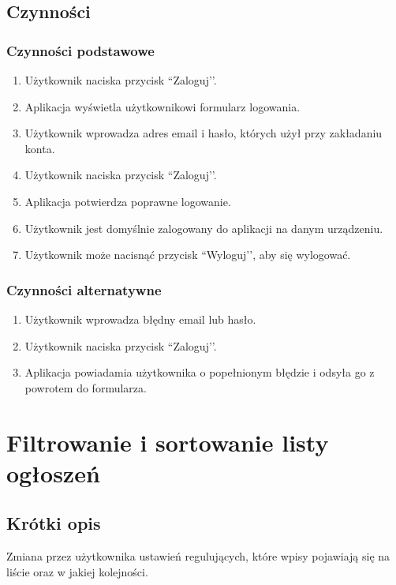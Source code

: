 \documentclass[12pt,a4paper,twoside]{article}
\begin{document}
    \subsection{Czynności}


    \subsubsection{Czynności podstawowe}


    \begin{enumerate}
        \item Użytkownik naciska przycisk ``Zaloguj’’.
        \item Aplikacja wyświetla użytkownikowi formularz logowania.
        \item Użytkownik wprowadza adres email i hasło, których użył przy zakładaniu konta.
        \item Użytkownik naciska przycisk ``Zaloguj’’.
        \item Aplikacja potwierdza poprawne logowanie.
     \item Użytkownik jest domyślnie zalogowany do aplikacji na danym urządzeniu.
     \item Użytkownik może nacisnąć przycisk ``Wyloguj’’, aby się wylogować.
    \end{enumerate}


    \subsubsection{Czynności alternatywne}


    \begin{enumerate}
        \item Użytkownik wprowadza błędny email lub hasło.
        \item Użytkownik naciska przycisk ``Zaloguj’’.
        \item Aplikacja powiadamia użytkownika o popełnionym błędzie i odsyła go z powrotem do formularza.
    \end{enumerate}


    \section{Filtrowanie i sortowanie listy ogłoszeń}


    \subsection{Krótki opis}
    Zmiana przez użytkownika ustawień regulujących, które wpisy pojawiają się na liście oraz w jakiej kolejności.
\end{document}
